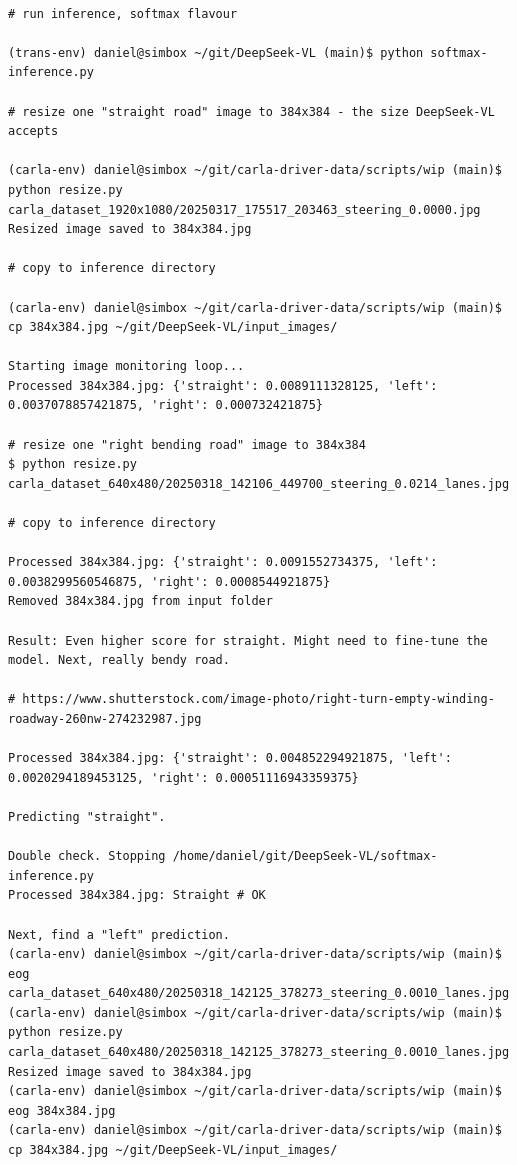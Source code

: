 \begin{verbatim}

# run inference, softmax flavour

(trans-env) daniel@simbox ~/git/DeepSeek-VL (main)$ python softmax-inference.py 

# resize one "straight road" image to 384x384 - the size DeepSeek-VL accepts

(carla-env) daniel@simbox ~/git/carla-driver-data/scripts/wip (main)$ python resize.py carla_dataset_1920x1080/20250317_175517_203463_steering_0.0000.jpg
Resized image saved to 384x384.jpg

# copy to inference directory

(carla-env) daniel@simbox ~/git/carla-driver-data/scripts/wip (main)$ cp 384x384.jpg ~/git/DeepSeek-VL/input_images/

Starting image monitoring loop...
Processed 384x384.jpg: {'straight': 0.0089111328125, 'left': 0.0037078857421875, 'right': 0.000732421875}

# resize one "right bending road" image to 384x384
$ python resize.py carla_dataset_640x480/20250318_142106_449700_steering_0.0214_lanes.jpg

# copy to inference directory

Processed 384x384.jpg: {'straight': 0.0091552734375, 'left': 0.0038299560546875, 'right': 0.0008544921875}
Removed 384x384.jpg from input folder

Result: Even higher score for straight. Might need to fine-tune the model. Next, really bendy road.

# https://www.shutterstock.com/image-photo/right-turn-empty-winding-roadway-260nw-274232987.jpg

Processed 384x384.jpg: {'straight': 0.004852294921875, 'left': 0.0020294189453125, 'right': 0.00051116943359375}

Predicting "straight".

Double check. Stopping /home/daniel/git/DeepSeek-VL/softmax-inference.py
Processed 384x384.jpg: Straight # OK

Next, find a "left" prediction.
(carla-env) daniel@simbox ~/git/carla-driver-data/scripts/wip (main)$ eog carla_dataset_640x480/20250318_142125_378273_steering_0.0010_lanes.jpg
(carla-env) daniel@simbox ~/git/carla-driver-data/scripts/wip (main)$ python resize.py carla_dataset_640x480/20250318_142125_378273_steering_0.0010_lanes.jpg
Resized image saved to 384x384.jpg
(carla-env) daniel@simbox ~/git/carla-driver-data/scripts/wip (main)$ eog 384x384.jpg 
(carla-env) daniel@simbox ~/git/carla-driver-data/scripts/wip (main)$ cp 384x384.jpg ~/git/DeepSeek-VL/input_images/


\end{verbatim}
